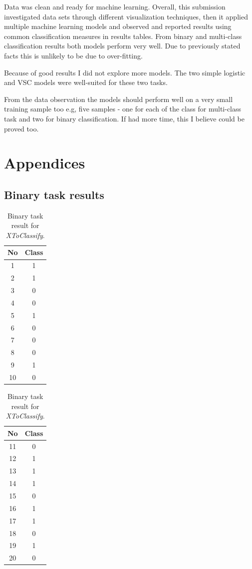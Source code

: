 \documentclass[11pt]{article}
\begin{document}
		Data was clean and ready for machine learning. Overall, this submission investigated data sets through different visualization techniques, then it applied multiple machine learning models and observed and reported results using common classification measures in results tables. From binary and multi-class classification results both models perform very well. Due to previously stated facts this is unlikely to be due to over-fitting. 

		Because of good results I did not explore more models. The two simple logistic and VSC models were well-suited for these two tasks. 

		From the data observation the models should perform well on a very small training sample too e.g, five samples - one for each of the class for multi-class task and two for binary classification. If had more time, this I believe could be proved too. 
	\clearpage
	\appendix
	\section{Appendices}
		\subsection{Binary task results}
		\begin{center}
		  	\begin{table}[h]
		  		\small

		  	\centering

			\begin{tabular}[b]{| c | c|} 
				\hline
				No & Class \\
				\hline
				1 & 1 \\ 2 & 1 \\ 3 & 0 \\ 4 & 0 \\ 5 & 1 \\ 6 & 0 \\ 7 & 0 \\ 8 & 0 \\ 9 & 1 \\ 10 & 0 \\
				\hline
			\end{tabular}
			\begin{tabular}[b]{| c | c|} 
				\hline
				No & Class \\
				\hline
				11 & 0 \\ 12 & 1 \\ 13 & 1 \\ 14 & 1 \\ 15 & 0 \\ 16 & 1 \\ 17 & 1 \\ 18 & 0 \\ 19 & 1 \\ 20 & 0 \\
				\hline
			\end{tabular}
			\caption{Binary task result for \textit{XToClassify}.}
			\label{tbl:final_binary}
			\end{table}
		\end{center}
\end{document}
